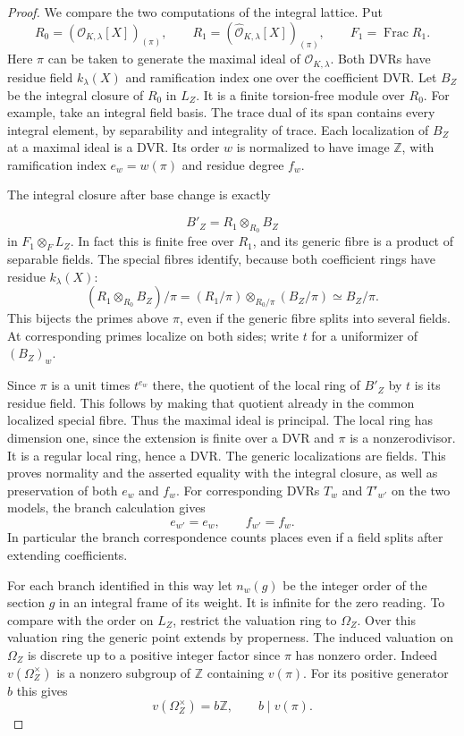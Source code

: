 \begin{proof}
We compare the two computations of the integral lattice. Put
\[
 R_0=(\mathcal O_{K,\lambda}[X])_{(\pi)},\qquad
 R_1=(\widehat{\mathcal O}_{K,\lambda}[X])_{(\pi)},\qquad
 F_1=\operatorname{Frac}R_1 .
\]
Here \(\pi\) can be taken to generate the maximal ideal of
\(\mathcal O_{K,\lambda}\). Both DVRs have residue field
\(k_\lambda(X)\) and ramification index one over the
coefficient DVR. Let \(B_Z\) be the integral closure of
\(R_0\) in \(L_Z\). It is a finite torsion-free module
over \(R_0\). For example, take an integral field basis.
The trace dual of its span contains every integral element,
by separability and integrality of trace. Each localization
of \(B_Z\) at a maximal ideal is a DVR. Its order \(w\) is
normalized to have image \(\mathbb Z\), with ramification
index \(e_w=w(\pi)\) and residue degree \(f_w\).

The integral closure after base change is exactly

\[
  B'_Z=R_1\otimes_{R_0}B_Z
\]
 in \(F_1\otimes_F L_Z\).
In fact this is finite free over \(R_1\), and its generic
fibre is a product of separable fields. The special fibres identify, because both coefficient rings
have residue \(k_\lambda(X)\):
\[
 (R_1\otimes_{R_0}B_Z)/\pi
       =(R_1/\pi)\otimes_{R_0/\pi}(B_Z/\pi)
       \simeq B_Z/\pi .
\]
This bijects the primes above \(\pi\), even if the generic
fibre splits into several fields. At corresponding
primes localize on both sides; write \(t\) for a uniformizer
of \((B_Z)_w\).

Since \(\pi\) is a unit times \(t^{e_w}\)
there, the quotient of the local ring of \(B'_Z\) by \(t\)
is its residue field. This follows by making that quotient
already in the common localized special fibre. Thus the
maximal ideal is principal. The local ring has dimension
one, since the extension is finite over a DVR and \(\pi\)
is a nonzerodivisor. It is a regular local ring, hence a DVR.
The generic localizations are fields. This proves normality
and the asserted equality with the integral closure, as well
as preservation of both \(e_w\) and \(f_w\).
For corresponding DVRs \(T_w\) and \(T'_{w'}\) on the two models, the branch calculation gives
\[
  e_{w'}=e_w,\qquad f_{w'}=f_w .
\]
 In particular
the branch correspondence counts places even if a field
splits after extending coefficients. \cite{dvr-slice}

For each branch identified in this way let \(n_w(g)\)
be the integer order of the section \(g\) in an integral
frame of its weight. It is infinite for the zero reading.
To compare with the order on \(L_Z\), restrict the valuation
ring to \(\Omega_Z\). Over this valuation ring the generic
point extends by properness. The induced valuation on
\(\Omega_Z\) is discrete up to a positive integer factor
since \(\pi\) has nonzero order.
Indeed \(v(\Omega_Z^\times)\) is a nonzero subgroup of \(\mathbb Z\) containing \(v(\pi)\). For its positive generator \(b\) this gives
\[
  v(\Omega_Z^\times)=b\mathbb Z,\qquad b\mid v(\pi).
\]


\end{proof}

